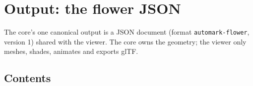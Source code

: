 \section{Output: the flower JSON}\label{sec:output}

The core's one canonical output is a JSON document (format
\texttt{automark-flower}, version 1) shared with the viewer. The core owns the
geometry; the viewer only meshes, shades, animates and exports glTF.

\subsection{Contents}
